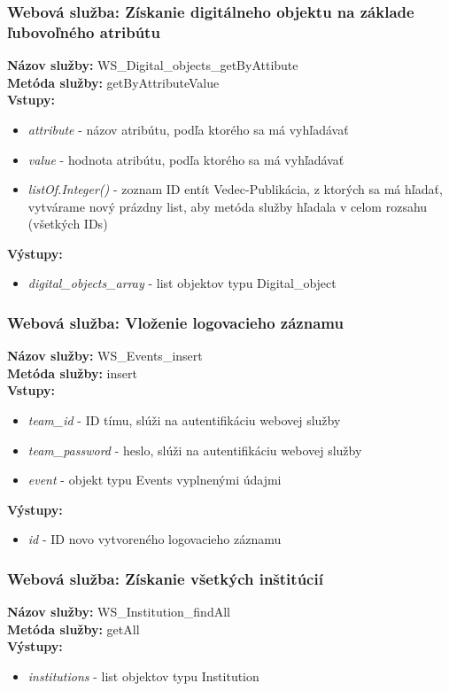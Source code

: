 \documentclass[10pt,oneside,slovak,a4paper]{article}
\begin{document}
\subsubsection{Webová služba: Získanie digitálneho objektu na základe ľubovoľného atribútu}
\textbf{Názov služby:} WS\_Digital\_objects\_getByAttibute\\
\textbf{Metóda služby:} getByAttributeValue\\
\textbf{Vstupy:}
	\begin{itemize}
		\item \textit{attribute} - názov atribútu, podľa ktorého sa má vyhľadávať
		\item \textit{value} - hodnota atribútu, podľa ktorého sa má vyhľadávať
		\item \textit{listOf.Integer()} - zoznam ID entít Vedec-Publikácia, z ktorých sa má hľadať, vytvárame nový prázdny list, aby metóda služby hľadala v celom rozsahu (všetkých IDs)
	\end{itemize}
\textbf{Výstupy:}
	\begin{itemize}
		\item \textit{digital\_objects\_array} - list objektov typu Digital\_object
	\end{itemize}
	
\subsubsection{Webová služba: Vloženie logovacieho záznamu}
\textbf{Názov služby:} WS\_Events\_insert\\
\textbf{Metóda služby:} insert\\
\textbf{Vstupy:}
	\begin{itemize}
		\item \textit{team\_id} - ID tímu, slúži na autentifikáciu webovej služby
		\item \textit{team\_password} - heslo, slúži na autentifikáciu webovej služby
		\item \textit{event} - objekt typu Events vyplnenými údajmi
	\end{itemize}
\textbf{Výstupy:}
	\begin{itemize}
		\item \textit{id} - ID novo vytvoreného logovacieho záznamu
	\end{itemize}
	
\subsubsection{Webová služba: Získanie všetkých inštitúcií}
\textbf{Názov služby:} WS\_Institution\_findAll\\
\textbf{Metóda služby:} getAll\\
\textbf{Výstupy:}
	\begin{itemize}
		\item \textit{institutions} - list objektov typu Institution
	\end{itemize}
	
\end{document}
